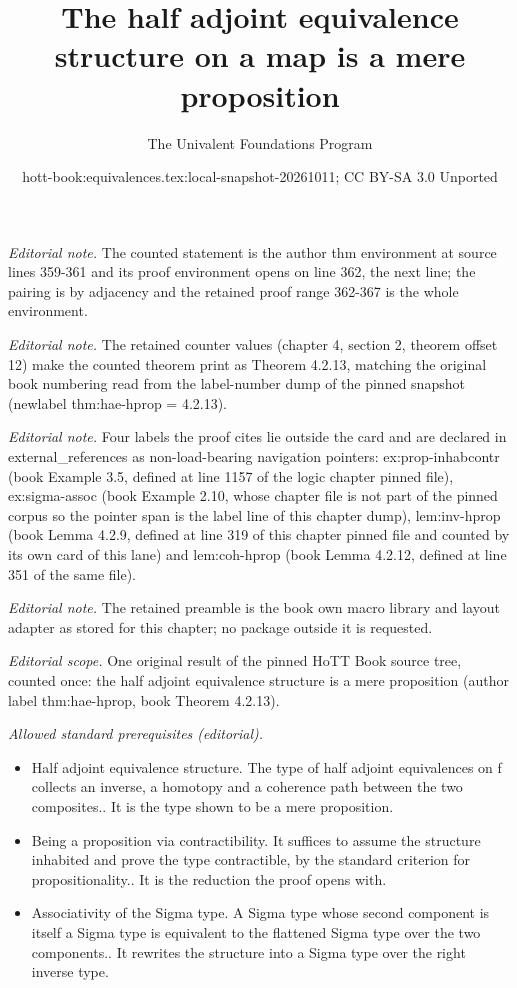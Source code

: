 \documentclass[10pt,a4paper]{article}
\title{The half adjoint equivalence structure on a map is a mere proposition}
\author{The Univalent Foundations Program}
\date{hott-book:equivalences.tex:local-snapshot-20261011; CC BY-SA 3.0 Unported}
\newcounter{chapter}
\theoremstyle{definition}
\theoremstyle{remark}
\numberwithin{equation}{section}
\begin{document}
\maketitle
\setcounter{chapter}{4}
\setcounter{section}{2}
\setcounter{thm}{12}
\noindent\textit{Editorial note.} The counted statement is the author thm environment at source lines 359-361 and its proof environment opens on line 362, the next line; the pairing is by adjacency and the retained proof range 362-367 is the whole environment.\par\medskip
\noindent\textit{Editorial note.} The retained counter values (chapter 4, section 2, theorem offset 12) make the counted theorem print as Theorem 4.2.13, matching the original book numbering read from the label-number dump of the pinned snapshot (newlabel thm:hae-hprop = 4.2.13).\par\medskip
\noindent\textit{Editorial note.} Four labels the proof cites lie outside the card and are declared in external\_references as non-load-bearing navigation pointers: ex:prop-inhabcontr (book Example 3.5, defined at line 1157 of the logic chapter pinned file), ex:sigma-assoc (book Example 2.10, whose chapter file is not part of the pinned corpus so the pointer span is the label line of this chapter dump), lem:inv-hprop (book Lemma 4.2.9, defined at line 319 of this chapter pinned file and counted by its own card of this lane) and lem:coh-hprop (book Lemma 4.2.12, defined at line 351 of the same file).\par\medskip
\noindent\textit{Editorial note.} The retained preamble is the book own macro library and layout adapter as stored for this chapter; no package outside it is requested.\par\medskip
\noindent\textit{Editorial scope.} One original result of the pinned HoTT Book source tree, counted once: the half adjoint equivalence structure is a mere proposition (author label thm:hae-hprop, book Theorem 4.2.13).\par\medskip
\noindent\textit{Allowed standard prerequisites (editorial).}\begin{itemize}
\item Half adjoint equivalence structure. The type of half adjoint equivalences on f collects an inverse, a homotopy and a coherence path between the two composites.. It is the type shown to be a mere proposition.
\item Being a proposition via contractibility. It suffices to assume the structure inhabited and prove the type contractible, by the standard criterion for propositionality.. It is the reduction the proof opens with.
\item Associativity of the Sigma type. A Sigma type whose second component is itself a Sigma type is equivalent to the flattened Sigma type over the two components.. It rewrites the structure into a Sigma type over the right inverse type.
\end{itemize}\medskip
\end{document}
